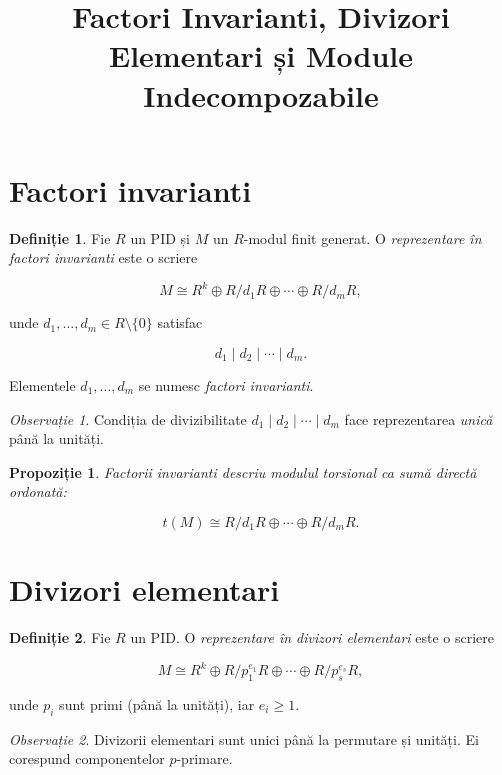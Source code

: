 \documentclass[12pt]{article}
\title{Factori Invarianti, Divizori Elementari și Module Indecompozabile}
\author{}
\date{}
\theoremstyle{definition}
\newtheorem{definition}{Definiție}
\theoremstyle{plain}
\theoremstyle{remark}
\newtheorem{remark}{Observație}
\theoremstyle{plain}
\newtheorem{proposition}{Propoziție}
\begin{document}
\maketitle

\section*{Factori invarianti}

\begin{definition}
Fie $R$ un PID și $M$ un $R$-modul finit generat. O \emph{reprezentare în factori invarianti} este o scriere


\[
M \cong R^k \oplus R/d_1R \oplus \cdots \oplus R/d_mR,
\]


unde $d_1, \dots, d_m \in R \setminus \{0\}$ satisfac


\[
d_1 \mid d_2 \mid \cdots \mid d_m.
\]


Elementele $d_1, \dots, d_m$ se numesc \emph{factori invarianti}.
\end{definition}

\begin{remark}
Condiția de divizibilitate $d_1 \mid d_2 \mid \cdots \mid d_m$ face reprezentarea \emph{unică} până la unități.
\end{remark}

\begin{proposition}
Factorii invarianti descriu modulul torsional ca sumă directă ordonată:


\[
t(M) \cong R/d_1R \oplus \cdots \oplus R/d_mR.
\]


\end{proposition}

\section*{Divizori elementari}

\begin{definition}
Fie $R$ un PID. O \emph{reprezentare în divizori elementari} este o scriere


\[
M \cong R^k \oplus R/p_1^{e_1}R \oplus \cdots \oplus R/p_s^{e_s}R,
\]


unde $p_i$ sunt primi (până la unități), iar $e_i \ge 1$.
\end{definition}

\begin{remark}
Divizorii elementari sunt unici până la permutare și unități. Ei corespund componentelor $p$-primare.
\end{remark}
\end{document}
